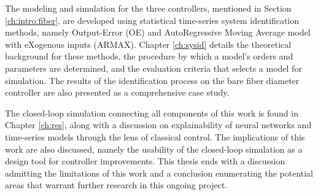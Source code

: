 The modeling and simulation for the three controllers, mentioned in Section \ref{ch:intro:fiber}, are developed using statistical time-series system identification methods, namely Output-Error (OE) and AutoRegressive Moving Average model with eXogenous inputs (ARMAX). Chapter \ref{ch:sysid} details the theoretical background for these methods, the procedure by which a model's orders and parameters are determined, and the evaluation criteria that selects a model for simulation. The results of the identification process on the bare fiber diameter controller are also presented as a comprehensive case study.

The closed-loop simulation connecting all components of this work is found in Chapter \ref{ch:res}, along with a discussion on explainability of neural networks and time-series models through the lens of classical control. The implications of this work are also discussed, namely the usability of the closed-loop simulation as a design tool for controller improvements. This thesis ends with a discussion admitting the limitations of this work and a conclusion enumerating the potential areas that warrant further research in this ongoing project. 

